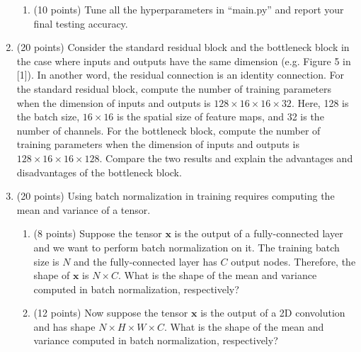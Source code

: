 \documentclass[11pt]{article}
\begin{document}
\begin{enumerate}
\begin{enumerate}
        \item (10 points) Tune all the hyperparameters in ``main.py'' and report your final testing accuracy.
    \end{enumerate}

    \item (20 points) Consider the standard residual block and the bottleneck block in the case where inputs and outputs have the same dimension (e.g. Figure 5 in [1]). In another word, the residual connection is an identity connection. For the standard residual block, compute the number of training parameters when the dimension of inputs and outputs is $128 \times 16 \times 16 \times 32$. Here, 128 is the batch size, $16 \times 16$ is the spatial size of feature maps, and 32 is the number of channels. For the bottleneck block, compute the number of training parameters when the dimension of inputs and outputs is $128 \times 16 \times 16 \times 128$. Compare the two results and explain the advantages and disadvantages of the bottleneck block.

    \item (20 points) Using batch normalization in training requires computing the mean and variance of a tensor.

    \begin{enumerate}
    \item (8 points) Suppose the tensor $\boldsymbol x$ is the output of a fully-connected layer and we want to perform batch normalization on it. The training batch size is $N$ and the fully-connected layer has $C$ output nodes. Therefore, the shape of $\boldsymbol x$ is $N \times C$. What is the shape of the mean and variance computed in batch normalization, respectively?

    \item (12 points) Now suppose the tensor $\boldsymbol x$ is the output of a 2D convolution and has shape $N \times H \times W \times C$. What is the shape of the mean and variance computed in batch normalization, respectively?
    \end{enumerate}

\end{enumerate}
\end{document}
